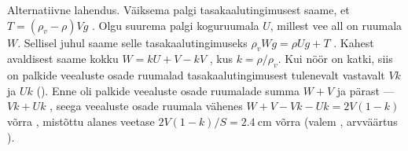 Alternatiivne lahendus.  Väiksema palgi tasakaalutingimusest saame, et $T=(\rho_v- \rho)Vg$ . Olgu suurema palgi koguruumala $U$, millest vee all on ruumala $W$. Sellisel juhul saame selle tasakaalutingimuseks $\rho_v Wg= \rho Ug+T$ . Kahest avaldisest saame kokku $W=kU+V-kV$ , kus $k=\rho/\rho_v$. Kui nöör on katki, siis on palkide veealuste osade ruumalad tasakaalutingimusest tulenevalt vastavalt $Vk$ ja $Uk$ (). Enne oli palkide veealuste osade ruumalade summa $W+V$  ja pärast --- $Vk+Uk$ , seega veealuste osade ruumala vähenes $W+V-Vk-Uk=2V(1-k)$ võrra , mistõttu alanes veetase $2V(1-k)/S=\SI{2.4}{\cm}$ võrra (valem , arvväärtus ).
\probend